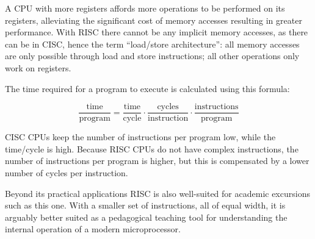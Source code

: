 A CPU with more registers affords more operations to be performed on
its registers, alleviating the significant cost of memory accesses
resulting in greater performance. With RISC there cannot be any
implicit memory accesses, as there can be in CISC, hence the term
``load/store architecture'': all memory accesses are only possible
through load and store instructions; all other operations only work on
registers.

The time required for a program to execute is calculated using this
formula:

\begin{equation*}
\frac{\textrm{time}}{\textrm{program}} =
\frac{\textrm{time}}{\textrm{cycle}} \cdot
\frac{\textrm{cycles}}{\textrm{instruction}} \cdot
\frac{\textrm{instructions}}{\textrm{program}}
\end{equation*}

CISC CPUs keep the number of instructions per program low, while the
time/cycle is high.  Because RISC CPUs do not have complex
instructions, the number of instructions per program is higher, but
this is compensated by a lower number of cycles per instruction. 

Beyond its practical applications RISC is also well-suited for
academic excursions such as this one. With a smaller set of
instructions, all of equal width, it is arguably better suited as a
pedagogical teaching tool for understanding the internal operation of
a modern microprocessor.
